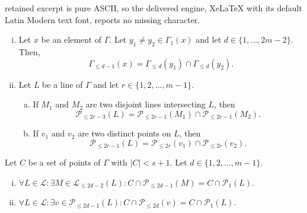 \documentclass[10pt,a4paper]{amsart}
\newcommand{\Lines}{\mathcal{L}}
\newcommand{\Points}{\mathcal{P}}
\begin{document}
retained excerpt is pure ASCII, so the delivered engine, XeLaTeX with its default Latin Modern text font, reports no missing character.
\begin{corollary}\label{intersections2}
\begin{enumerate}[(i)]
\item 	Let \(x\) be an element of $\Gamma$. Let \(y_1\neq y_2 \in \Gamma_1(x)\) and let \(d\in\{1,\dots,2m-2\}\).
	Then,
	\[\Gamma_{\le d - 1}(x) = \Gamma_{\le d}(y_1)\cap\Gamma_{\le d}(y_2).\]

\item  Let \(L\) be a line of \(\Gamma\) and let \(r\in \{1,2,\dots,m-1\}\).
	\begin{enumerate}[(a)]
		\item If 
		\(M_1\) and \(M_2\) are two disjoint lines intersecting \(L\),
		then
		\[\Points_{\le 2r-3}(L) = \Points_{\le 2r-1}(M_1)\cap\Points_{\le 2r-1}(M_2).\]
		\item If
		\(v_1\) and \(v_2\) are two distinct points on \(L\), then
		\[\Points_{\le 2r-1}(L) = \Points_{\le 2r}(v_1)\cap\Points_{\le 2r}(v_2).\]
	\end{enumerate}
\end{enumerate}
\end{corollary}

\begin{lemma}\label{starLemma}
	Let \(C\) be a set of points of $\Gamma$ with \(|C|<s+1\). Let \(d\in \{1,2,\dots,m-1\}\).
	\begin{enumerate}[(i)]
		\item \(\forall L \in \Lines: \exists M \in \Lines_{\le 2d-2}(L): C\cap \Points_{\le2d-1}(M) = C\cap \Points_{1}(L)\).
		\item \(\forall L \in \Lines: \exists v \in \Points_{\le 2d-1}(L): C\cap \Points_{\le2d}(v) = C\cap \Points_{1}(L)\).
	\end{enumerate}
\end{lemma}
\end{document}
